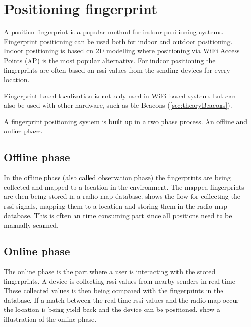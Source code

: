 \section{Positioning fingerprint}\label{sec:theoryFingerprint} A position fingerprint is a popular method for indoor positioning systems. 
Fingerprint positioning can be used both for indoor and outdoor positioning.
Indoor positioning is based on 2D modelling where positioning via WiFi Access Points (AP) is the most popular alternative.
For indoor positioning the fingerprints are often based on \acrshort{rssi} values from the sending devices for every location.
\cite{LocationFingerprintingInfrastructure2004,
IndoorFingerprintPositioning2017}

\bigskip

Fingerprint based localization is not only used in WiFi based systems but can
also be used with other hardware, such as \acrshort{ble} Beacons (\cref{sec:theoryBeacons}).
\cite{PracticalFingerprintingLocalization2017} 

\bigskip

A fingerprint positioning system is built up in a two phase process.  An offline
and online phase.\cite{IndoorFingerprintPositioning2017} 

\subsection{Offline phase}\label{sec:theoryFingerprintOffline} In the offline
phase (also called observation phase) the fingerprints are being collected and
mapped to a location in the environment.
The mapped fingerprints are then being stored in a radio map database.
 shows the flow for collecting the \acrshort{rssi} signals, mapping them to a location and storing them in the radio map database.  This is often an time consuming part since all positions need to be manually
scanned.\cite{IndoorFingerprintPositioning2017} 



\newpage

\subsection{Online phase}\label{sec:theoryFingerprintOnline} The online phase
is the part where a user is interacting with the stored fingerprints.
A device is collecting \acrshort{rssi} values from nearby senders in real time.
These collected values is then being compared with the fingerprints in the database.
If a match between the real time \acrshort{rssi} values and the radio map occur the location is being yield back and the device can be positioned.
 show a illustration of the
online phase.
\cite{IndoorFingerprintPositioning2017}


